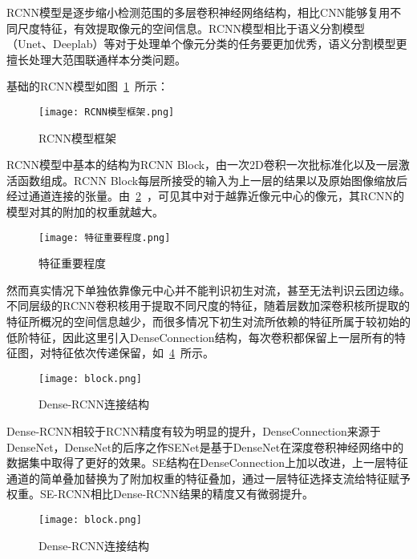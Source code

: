RCNN模型是逐步缩小检测范围的多层卷积神经网络结构，相比CNN能够复用不同尺度特征，有效提取像元的空间信息。RCNN模型相比于语义分割模型（Unet、Deeplab）等对于处理单个像元分类的任务要更加优秀，语义分割模型更擅长处理大范围联通样本分类问题。

基础的RCNN模型如图~\ref{RCNN_model}~所示：

\begin{figure}[h]
	\centering
	\texttt{[image: RCNN模型框架.png]}
	\caption{RCNN模型框架}
	\label{RCNN_model}
\end{figure}

RCNN模型中基本的结构为RCNN Block，由一次2D卷积一次批标准化以及一层激活函数组成。RCNN Block每层所接受的输入为上一层的结果以及原始图像缩放后经过通道连接的张量。由~\ref{feature_importance}~，可见其中对于越靠近像元中心的像元，其RCNN的模型对其的附加的权重就越大。

\begin{figure}[h]
	\centering
	\texttt{[image: 特征重要程度.png]}
	\caption{特征重要程度}
	\label{feature_importance}
\end{figure}

然而真实情况下单独依靠像元中心并不能判识初生对流，甚至无法判识云团边缘。不同层级的RCNN卷积核用于提取不同尺度的特征，随着层数加深卷积核所提取的特征所概况的空间信息越少，而很多情况下初生对流所依赖的特征所属于较初始的低阶特征，因此这里引入DenseConnection结构，每次卷积都保留上一层所有的特征图，对特征依次传递保留，如~\ref{Dense_RCNN_model}~所示。

\begin{figure}[h]
	\centering
	\texttt{[image: block.png]}
	\caption{Dense-RCNN连接结构}
	\label{Dense_RCNN_model}
\end{figure}

Dense-RCNN相较于RCNN精度有较为明显的提升，DenseConnection来源于DenseNet，DenseNet的后序之作SENet是基于DenseNet在深度卷积神经网络中的数据集中取得了更好的效果。SE结构在DenseConnection上加以改进，上一层特征通道的简单叠加替换为了附加权重的特征叠加，通过一层特征选择支流给特征赋予权重。SE-RCNN相比Dense-RCNN结果的精度又有微弱提升。

\begin{figure}[h]
	\centering
	\texttt{[image: block.png]}
	\caption{Dense-RCNN连接结构}
	\label{Dense_RCNN_model}
\end{figure}
